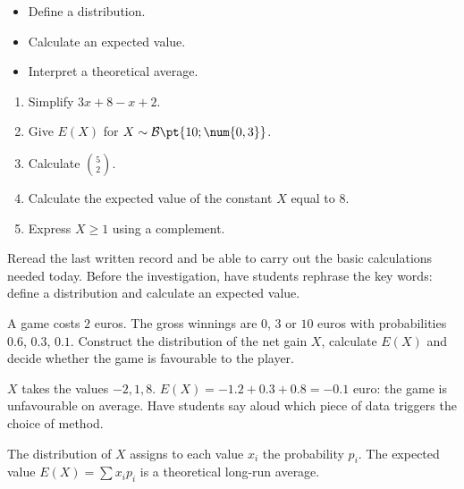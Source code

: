 \begin{objectives}\begin{itemize}\item Define a distribution.\item Calculate an expected value.\item Interpret a theoretical average.\end{itemize}\end{objectives}
\begin{fluency}\begin{enumerate}\item Simplify $3x+8-x+2$. \item Give $E(X)$ for $X\sim\mathcal B\pt{10;\num{0,3}}$. \item Calculate $\binom52$. \item Calculate the expected value of the constant $X$ equal to $8$. \item Express $X\geq1$ using a complement. \end{enumerate}\end{fluency}
\begin{prerequisites}Reread the last written record and be able to carry out the basic calculations needed today. Before the investigation, have students rephrase the key words: define a distribution and calculate an expected value.\end{prerequisites}

\begin{activity}
A game costs $2$ euros. The gross winnings are $0$, $3$ or $10$ euros with probabilities $\num{0,6}$, $\num{0,3}$, $\num{0,1}$. Construct the distribution of the net gain $X$, calculate $E(X)$ and decide whether the game is favourable to the player.

\end{activity}
\begin{solution}$X$ takes the values $-2,1,8$. $E(X)=-\num{1,2}+\num{0,3}+\num{0,8}=-\num{0,1}$ euro: the game is unfavourable on average. Have students say aloud which piece of data triggers the choice of method.\end{solution}

\begin{summary}The distribution of $X$ assigns to each value $x_i$ the probability $p_i$. The expected value $E(X)=\sum x_ip_i$ is a theoretical long-run average.\end{summary}

